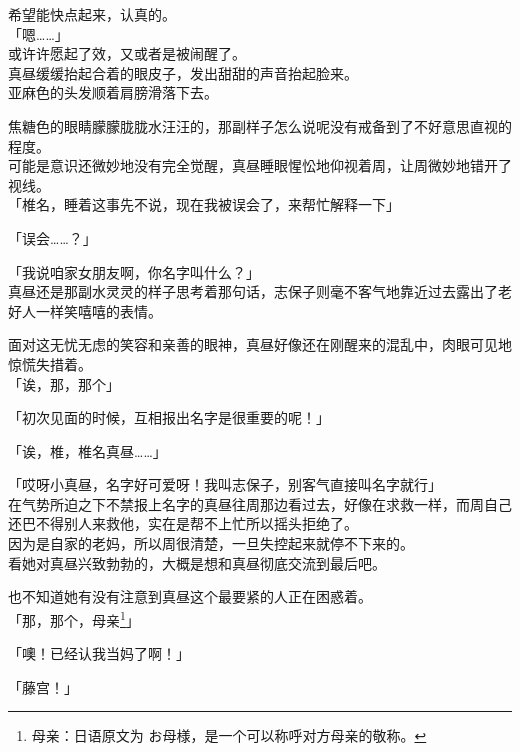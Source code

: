 希望能快点起来，认真的。\\

「嗯……」\\

或许许愿起了效，又或者是被闹醒了。\\

真昼缓缓抬起合着的眼皮子，发出甜甜的声音抬起脸来。\\

亚麻色的头发顺着肩膀滑落下去。

焦糖色的眼睛朦朦胧胧水汪汪的，那副样子怎么说呢没有戒备到了不好意思直视的程度。\\

可能是意识还微妙地没有完全觉醒，真昼睡眼惺忪地仰视着周，让周微妙地错开了视线。\\

「椎名，睡着这事先不说，现在我被误会了，来帮忙解释一下」

「误会……？」

「我说咱家女朋友啊，你名字叫什么？」\\

真昼还是那副水灵灵的样子思考着那句话，志保子则毫不客气地靠近过去露出了老好人一样笑嘻嘻的表情。

面对这无忧无虑的笑容和亲善的眼神，真昼好像还在刚醒来的混乱中，肉眼可见地惊慌失措着。\\

「诶，那，那个」

「初次见面的时候，互相报出名字是很重要的呢！」

「诶，椎，椎名真昼……」

「哎呀小真昼，名字好可爱呀！我叫志保子，别客气直接叫名字就行」\\

在气势所迫之下不禁报上名字的真昼往周那边看过去，好像在求救一样，而周自己还巴不得别人来救他，实在是帮不上忙所以摇头拒绝了。\\

因为是自家的老妈，所以周很清楚，一旦失控起来就停不下来的。\\

看她对真昼兴致勃勃的，大概是想和真昼彻底交流到最后吧。

也不知道她有没有注意到真昼这个最要紧的人正在困惑着。\\

「那，那个，母亲\footnote{母亲：日语原文为 {\jpfont お母様}，是一个可以称呼对方母亲的敬称。}」

「噢！已经认我当妈了啊！」

「藤宫！」

